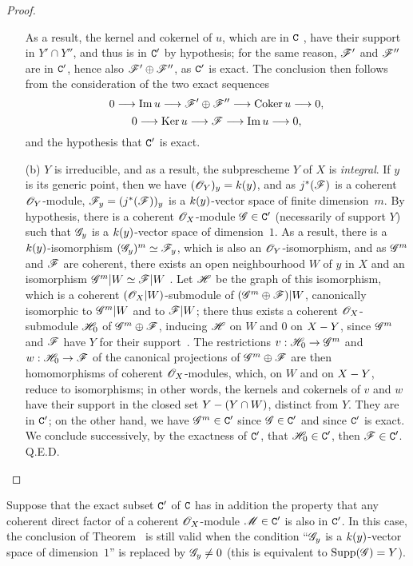 \begin{proof}
\begin{enumerate}
    As a result, the kernel and cokernel of $u$, which are in $\mathtt{C}$ , have their support in $Y'\cap Y''$, and thus is in $\mathtt{C}'$ by hypothesis; for the same reason, $\mathscr{F}'$ and $\mathscr{F}''$ are in $\mathtt{C}'$, hence also $\mathscr{F}'\oplus\mathscr{F}''$, as $\mathtt{C}'$ is exact.
    The conclusion then follows from the consideration of the two exact sequences
    \[
      0\to\Im u\to\sh{F}'\oplus\sh{F}''\to\Coker u\to 0,
    \]
    \[
      0\to\Ker u\to\sh{F}\to\Im u\to 0,
    \]
    and the hypothesis that $\mathtt{C}'$ is exact.
  \item[(b)] $Y$ is irreducible, and as a result, the subprescheme $Y$ of $X$ is \emph{integral}.
    If $y$ is its generic point, then we have $(\mathscr{O}_Y)_y=k(y)$, and as $j^*(\mathscr{F})$ is a coherent $\mathscr{O}_Y$-module, $\mathscr{F}_y=(j^*(\mathscr{F}))_y$ is a $k(y)$-vector space of finite dimension~$m$.
    By hypothesis, there is a coherent $\mathscr{O}_X$-module $\mathscr{G}\in\mathtt{C}'$ (necessarily of support $Y$) such that $\mathscr{G}_y$ is a $k(y)$-vector space of dimension~$1$.
    As a result, there is a $k(y)$-isomorphism $(\mathscr{G}_y)^m\simeq\mathscr{F}_y$, which is also an $\mathscr{O}_Y$-isomorphism, and as $\mathscr{G}^m$ and $\mathscr{F}$ are coherent, there exists an open neighbourhood $W$ of $y$ in $X$ and an isomorphism $\mathscr{G}^m|W\simeq\mathscr{F}|W$ .
    Let $\mathscr{H}$ be the graph of this isomorphism, which is a coherent $(\mathscr{O}_X|W)$-submodule of $(\mathscr{G}^m\oplus\mathscr{F})|W$, canonically isomorphic to $\mathscr{G}^m|W$ and to $\mathscr{F}|W$; there thus exists a coherent $\mathscr{O}_X$-submodule $\mathscr{H}_0$ of $\mathscr{G}^m\oplus\mathscr{F}$, inducing $\mathscr{H}$ on $W$ and $0$ on $X- Y$, since $\mathscr{G}^m$ and $\mathscr{F}$ have $Y$ for their support~.
    The restrictions $v:\sh{H}_0\to\sh{G}^m$ and $w:\sh{H}_0\to\sh{F}$ of the canonical projections of $\mathscr{G}^m\oplus\mathscr{F}$ are then homomorphisms of coherent $\mathscr{O}_X$-modules, which, on $W$ and on $X- Y$, reduce to isomorphisms; in other words, the kernels and cokernels of $v$ and $w$ have their support in the closed set $Y-(Y\cap W)$, distinct from $Y$.
    They are in $\mathtt{C}'$; on the other hand, we have $\mathscr{G}^m\in\mathtt{C}'$ since $\mathscr{G}\in\mathtt{C}'$ and since $\mathtt{C}'$ is exact.
    We conclude successively, by the exactness of $\mathtt{C}'$, that $\mathscr{H}_0\in\mathtt{C}'$, then $\mathscr{F}\in\mathtt{C}'$.
Q.E.D.
\end{enumerate}
\end{proof}

\begin{corollary}[3.1.3]
\label{III.3.1.3}
Suppose that the exact subset $\mathtt{C}'$ of $\mathtt{C}$ has in addition the property that any coherent direct factor of a coherent $\mathscr{O}_X$-module $\mathscr{M}\in\mathtt{C}'$ is also in $\mathtt{C}'$.
In this case, the conclusion of Theorem~ is still valid when the condition ``$\mathscr{G}_y$ is a $k(y)$-vector space of dimension~$1$'' is replaced by $\mathscr{G}_y\neq 0$ (this is equivalent to $\operatorname{Supp}(\mathscr{G})=Y$).
\end{corollary}

